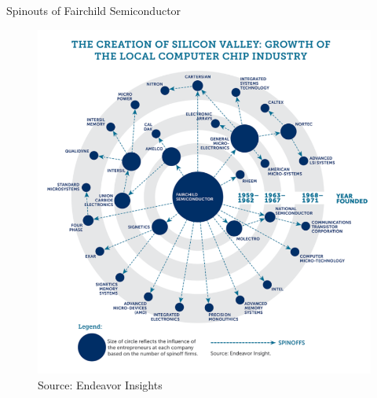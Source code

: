 \documentclass[english,usenames,dvipsnames]{beamer}
\begin{document}

\appendix

\captionsetup[figure]{labelformat=empty}

\begin{frame}{Spinouts of Fairchild Semiconductor}
\label{fairchild_spinouts}
\hyperlink{Introduction}{}
\begin{figure}
	\includegraphics[scale=0.38]{figures/fairchild_spinouts}
	\caption{Source: Endeavor Insights}
\end{figure}
\end{frame}
\end{document}
